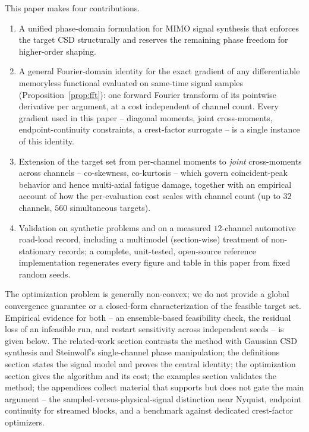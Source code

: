 \documentclass[10pt,a4paper]{article}
\numberwithin{equation}{section}
\begin{document}
This paper makes four contributions.
\begin{enumerate}
\item A unified phase-domain formulation for MIMO signal synthesis that enforces the target CSD structurally and reserves the remaining phase freedom for higher-order shaping.
\item A general Fourier-domain identity for the exact gradient of any differentiable memoryless functional evaluated on same-time signal samples (Proposition~\ref{prop:fft}): one forward Fourier transform of its pointwise derivative per argument, at a cost independent of channel count. Every gradient used in this paper -- diagonal moments, joint cross-moments, endpoint-continuity constraints, a crest-factor surrogate -- is a single instance of this identity.
\item Extension of the target set from per-channel moments to \emph{joint} cross-moments across channels -- co-skewness, co-kurtosis -- which govern coincident-peak behavior and hence multi-axial fatigue damage, together with an empirical account of how the per-evaluation cost scales with channel count (up to $32$ channels, $560$ simultaneous targets).
\item Validation on synthetic problems and on a measured $12$-channel automotive road-load record, including a multimodel (section-wise) treatment of non-stationary records; a complete, unit-tested, open-source reference implementation regenerates every figure and table in this paper from fixed random seeds.
\end{enumerate}

The optimization problem is generally non-convex; we do not provide a global convergence guarantee or a closed-form characterization of the feasible target set. Empirical evidence for both -- an ensemble-based feasibility check, the residual loss of an infeasible run, and restart sensitivity across independent seeds -- is given below. The related-work section contrasts the method with Gaussian CSD synthesis and Steinwolf's single-channel phase manipulation; the definitions section states the signal model and proves the central identity; the optimization section gives the algorithm and its cost; the examples section validates the method; the appendices collect material that supports but does not gate the main argument -- the sampled-versus-physical-signal distinction near Nyquist, endpoint continuity for streamed blocks, and a benchmark against dedicated crest-factor optimizers.

\end{document}
